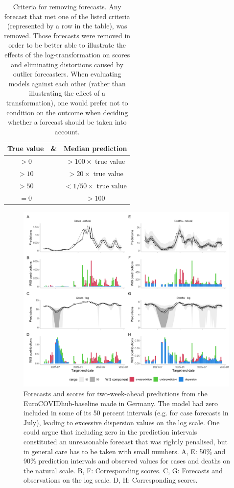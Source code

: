 \documentclass{article}
\begin{document}
\begin{table}
\centering
\begin{tabular}{ccc}
\toprule
True value & \& & Median prediction\\
\midrule
$>0$ & \ & $>100\times$ true value\\
$>10$ & \  & $>20\times$ true value\\
$>50$ & \  & $<1/50\times$ true value\\
$= 0$ & \  & $>100$\\
\bottomrule
\end{tabular}
\caption{Criteria for removing forecasts. Any forecast that met one of the listed criteria (represented by a row in the table), was removed. Those forecasts were removed in order to be better able to illustrate the effects of the log-transformation on scores and eliminating distortions caused by outlier forecasters. When evaluating models against each other (rather than illustrating the effect of a transformation), one would prefer not to condition on the outcome when deciding whether a forecast should be taken into account. }
\label{tab:erroneous}
\end{table}


\begin{figure}[h!]
    \centering
    \includegraphics[width=0.99\textwidth]{output/figures/HUB-model-comparison-baseline.png}
    \caption{
    Forecasts and scores for two-week-ahead predictions from the EuroCOVIDhub-baseline made in Germany. The model had zero included in some of its 50 percent intervals (e.g. for case forecasts in July), leading to excessive dispersion values on the log scale. One could argue that including zero in the prediction intervals constituted an unreasonable forecast that was rightly penalised, but in general care has to be taken with small numbers. A, E: 50\% and 90\% prediction intervals and observed values for cases and deaths on the natural scale. B, F: Corresponding scores. C, G: Forecasts and observations on the log scale. D, H: Corresponding scores. 
    }
    \label{fig:HUB-model-comparison-baseline}
\end{figure}
\end{document}
